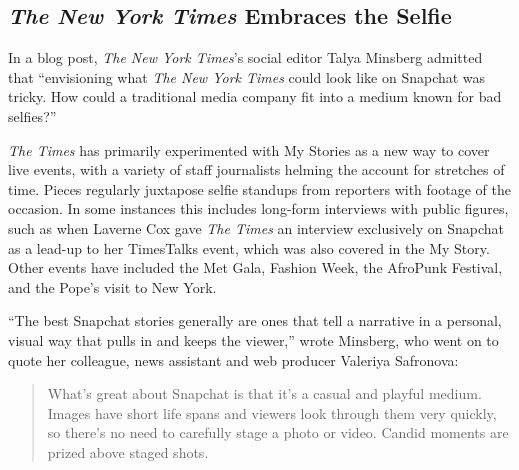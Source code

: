 \documentclass[notoc, symmetric, nobib, nols]{towcenter-guideto-book}
\begin{document}
\subsection[The New York Times Embraces the Selfie]{\textit{The New York Times} Embraces the Selfie}

In a blog post, \textit{The New York Times}'s social editor Talya Minsberg admitted that ``envisioning what \textit{The New York Times} could look like on Snapchat was tricky. How could a traditional media company fit into a medium known for bad selfies?''\autocite{NYTsnapchat}

\textit{The Times} has primarily experimented with My Stories as a new way to cover live events, with a variety of staff journalists helming the account for stretches of time. Pieces regularly juxtapose selfie standups from reporters with footage of the occasion.  In some instances this includes long-form interviews with public figures, such as when Laverne Cox gave \textit{The Times} an interview exclusively on Snapchat as a lead-up to her TimesTalks event, which was also covered in the My Story. Other events have included the Met Gala, Fashion Week, the AfroPunk Festival, and the Pope's visit to New York.  

``The best Snapchat stories generally are ones that tell a narrative in a personal, visual way that pulls in and keeps the viewer,'' wrote Minsberg, who went on to quote her colleague, news assistant and web producer Valeriya Safronova: 

\begin{quote}
What's great about Snapchat is that it's a casual and playful medium. Images have short life spans and viewers look through them very quickly, so there's no need to carefully stage a photo or video. Candid moments are prized above staged shots. 
\end{quote}



\end{document}
